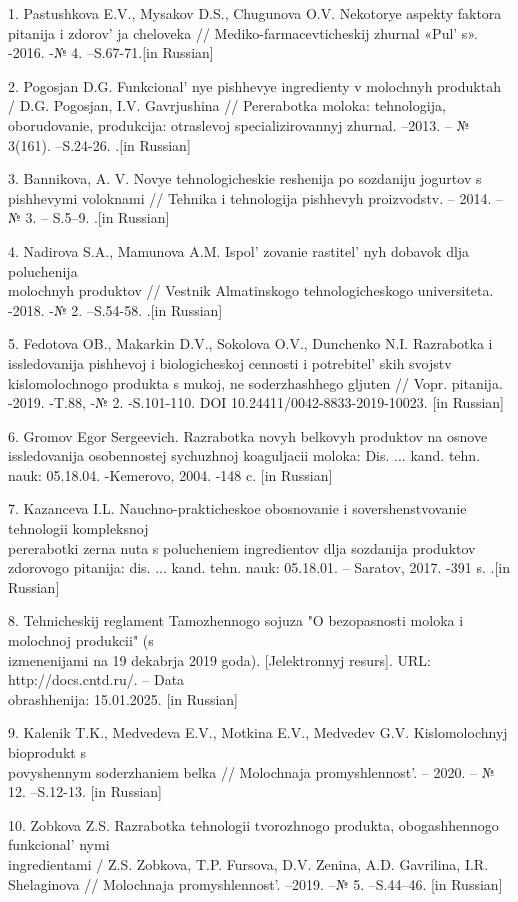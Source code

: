 \begin{references}
1. Pastushkova E.V., Mysakov D.S., Chugunova O.V. Nekotorye aspekty
faktora pitanija i zdorov' ja cheloveka //
Mediko-farmacevticheskij zhurnal «Pul' s». -2016. -№ 4.
--S.67-71.{[}in Russian{]}

2. Pogosjan D.G. Funkcional' nye pishhevye ingredienty v
molochnyh produktah / D.G. Pogosjan, I.V. Gavrjushina // Pererabotka
moloka: tehnologija, oborudovanie, produkcija: otraslevoj
specializirovannyj zhurnal. --2013. -- № 3(161). --S.24-26. .{[}in
Russian{]}

3. Bannikova, A. V. Novye tehnologicheskie reshenija po sozdaniju
jogurtov s pishhevymi voloknami // Tehnika i tehnologija pishhevyh
proizvodstv. -- 2014. -- № 3. -- S.5--9. .{[}in Russian{]}

4. Nadirova S.A., Mamunova A.M. Ispol' zovanie
rastitel' nyh dobavok dlja poluchenija \\molochnyh
produktov // Vestnik Almatinskogo tehnologicheskogo universiteta. -2018.
-№ 2. --S.54-58. .{[}in Russian{]}

5. Fedotova OB., Makarkin D.V., Sokolova O.V., Dunchenko N.I. Razrabotka
i issledovanija pishhevoj i biologicheskoj cennosti i
potrebitel' skih svojstv kislomolochnogo produkta s
mukoj, ne soderzhashhego gljuten // Vopr. pitanija. -2019. -T.88, -№ 2.
-S.101-110. DOI 10.24411/0042-8833-2019-10023. {[}in Russian{]}

6. Gromov Egor Sergeevich. Razrabotka novyh belkovyh produktov na osnove
issledovanija osobennostej sychuzhnoj koaguljacii moloka: Dis. ... kand.
tehn. nauk: 05.18.04. -Kemerovo, 2004. -148 c. {[}in Russian{]}

7. Kazanceva I.L. Nauchno-prakticheskoe obosnovanie i sovershenstvovanie
tehnologii kompleksnoj \\pererabotki zerna nuta s polucheniem ingredientov
dlja sozdanija produktov zdorovogo pitanija: dis. ... kand. tehn. nauk:
05.18.01. -- Saratov, 2017. -391 s. .{[}in Russian{]}

8. Tehnicheskij reglament Tamozhennogo sojuza "O bezopasnosti moloka i
molochnoj produkcii" (s \\izmenenijami na 19 dekabrja 2019 goda).
{[}Jelektronnyj resurs{]}. URL: http://docs.cntd.ru/. -- Data\\
obrashhenija: 15.01.2025. {[}in Russian{]}

9. Kalenik T.K., Medvedeva E.V., Motkina E.V., Medvedev G.V.
Kislomolochnyj bioprodukt s \\povyshennym soderzhaniem belka // Molochnaja
promyshlennost'. -- 2020. -- № 12. --S.12-13. {[}in
Russian{]}

10. Zobkova Z.S. Razrabotka tehnologii tvorozhnogo produkta,
obogashhennogo funkcional' nymi \\ingredientami / Z.S.
Zobkova, T.P. Fursova, D.V. Zenina, A.D. Gavrilina, I.R. Shelaginova //
Molochnaja promyshlennost'. --2019. --№ 5. --S.44--46.
{[}in Russian{]}
\end{references}


